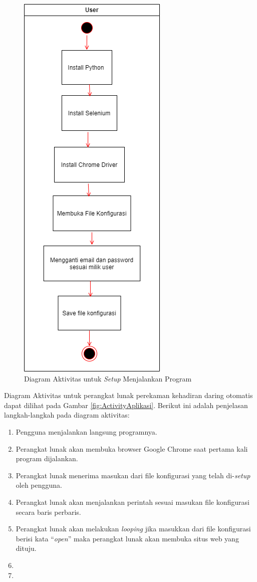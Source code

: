 \begin{figure}[H]
	\centering
	\includegraphics[scale=0.4]{Gambar/ActivitySetup.png}
	\caption{Diagram Aktivitas untuk \textit{Setup} Menjalankan Program} 
	\label{fig:ActivitySetup}
\end{figure}
Diagram Aktivitas untuk perangkat lunak perekaman kehadiran daring otomatis dapat dilihat pada Gambar \ref{fig:ActivityAplikasi}. Berikut ini adalah penjelasan langkah-langkah pada diagram aktivitas:
\begin{enumerate}
	\item Pengguna menjalankan langsung programnya.
	\item Perangkat lunak akan membuka browser Google Chrome saat pertama kali program dijalankan.
	\item Perangkat lunak menerima masukan dari file konfigurasi yang telah di-\textit{setup} oleh pengguna.
	\item Perangkat lunak akan menjalankan perintah sesuai masukan file konfigurasi secara baris perbaris.
	\item Perangkat lunak akan melakukan \textit{looping} jika masukkan dari file konfigurasi berisi kata ``\textit{open}'' maka perangkat lunak akan membuka situs web yang dituju.
	\item 
	\item
\end{enumerate}
